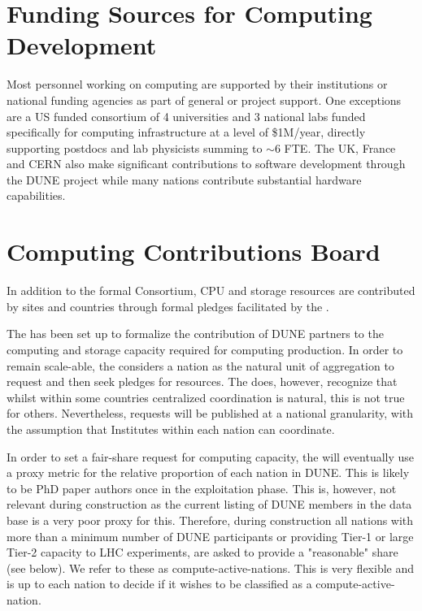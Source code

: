 \documentclass[../main-v1.tex]{subfiles}
\begin{document}
\section{Funding Sources for Computing Development}
Most personnel working on  computing are supported by their institutions or national funding agencies as part of general or  project support.  One exceptions are a US  funded consortium of 4 universities and 3 national labs funded specifically for  computing infrastructure at a level of \$1M/year, directly supporting postdocs and lab physicists summing to $\sim 6$ FTE.  The UK,  France and CERN also make significant contributions to software development through the DUNE project while many nations contribute substantial hardware capabilities. 


\section{Computing Contributions Board }\label{sec:ccb}

In addition to the formal Consortium, CPU and storage resources are contributed by sites and countries through formal pledges facilitated by the . 

The  has been set up to formalize the contribution of DUNE partners to the computing and storage capacity required for computing production. In order to remain scale-able, the  considers a nation as the natural unit of aggregation to request and then seek pledges for resources. The  does, however, recognize that whilst within some countries centralized coordination is natural, this is not true for others. Nevertheless, requests will be published at a national granularity, with the assumption that Institutes within each nation can coordinate.

In order to set a fair-share request for computing capacity, the  will eventually use a proxy metric for the relative proportion of each nation in DUNE. This is likely to be PhD paper authors once in the exploitation phase. This is, however, not relevant during construction as the current listing of DUNE members in the data base is a very poor proxy for this. Therefore, during construction all nations with more than a minimum number of DUNE participants or providing Tier-1 or large Tier-2 capacity to LHC experiments, are asked to provide a "reasonable" share (see below). We refer to these as compute-active-nations.
This is very flexible and is up to each nation to decide if it wishes to be classified as a compute-active-nation.
\end{document}
